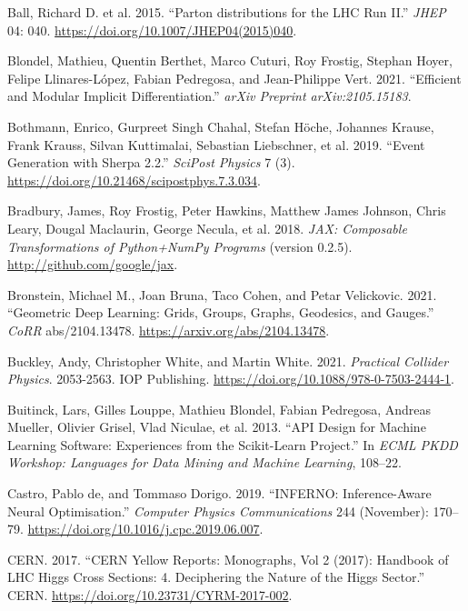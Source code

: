 \documentclass[
  11pt,
  numbers=noendperiod]{book}
\newlength{\cslhangindent}
\newlength{\cslentryspacingunit} %
\newenvironment{CSLReferences}[2] %
 {%
  \setlength{\parindent}{0pt}
  \ifodd #1
  \let\oldpar\par
  \def\par{\hangindent=\cslhangindent\oldpar}
  \fi
  \setlength{\parskip}{#2\cslentryspacingunit}
 }%
 {}
\begin{document}
\begin{CSLReferences}{1}{0}
\leavevmode{}%
Ball, Richard D. et al. 2015. {``{Parton distributions for the LHC Run
II}.''} \emph{JHEP} 04: 040.
\url{https://doi.org/10.1007/JHEP04(2015)040}.

\leavevmode{}%
Blondel, Mathieu, Quentin Berthet, Marco Cuturi, Roy Frostig, Stephan
Hoyer, Felipe Llinares-López, Fabian Pedregosa, and Jean-Philippe Vert.
2021. {``Efficient and Modular Implicit Differentiation.''} \emph{arXiv
Preprint arXiv:2105.15183}.

\leavevmode{}%
Bothmann, Enrico, Gurpreet Singh Chahal, Stefan Höche, Johannes Krause,
Frank Krauss, Silvan Kuttimalai, Sebastian Liebschner, et al. 2019.
{``Event Generation with Sherpa 2.2.''} \emph{{SciPost} Physics} 7 (3).
\url{https://doi.org/10.21468/scipostphys.7.3.034}.

\leavevmode{}%
Bradbury, James, Roy Frostig, Peter Hawkins, Matthew James Johnson,
Chris Leary, Dougal Maclaurin, George Necula, et al. 2018. \emph{{JAX}:
Composable Transformations of {P}ython+{N}um{P}y Programs} (version
0.2.5). \url{http://github.com/google/jax}.

\leavevmode{}%
Bronstein, Michael M., Joan Bruna, Taco Cohen, and Petar Velickovic.
2021. {``Geometric Deep Learning: Grids, Groups, Graphs, Geodesics, and
Gauges.''} \emph{CoRR} abs/2104.13478.
\url{https://arxiv.org/abs/2104.13478}.

\leavevmode{}%
Buckley, Andy, Christopher White, and Martin White. 2021.
\emph{Practical Collider Physics}. 2053-2563. IOP Publishing.
\url{https://doi.org/10.1088/978-0-7503-2444-1}.

\leavevmode{}%
Buitinck, Lars, Gilles Louppe, Mathieu Blondel, Fabian Pedregosa,
Andreas Mueller, Olivier Grisel, Vlad Niculae, et al. 2013. {``{API}
Design for Machine Learning Software: Experiences from the Scikit-Learn
Project.''} In \emph{ECML PKDD Workshop: Languages for Data Mining and
Machine Learning}, 108--22.

\leavevmode{}%
Castro, Pablo de, and Tommaso Dorigo. 2019. {``INFERNO: Inference-Aware
Neural Optimisation.''} \emph{Computer Physics Communications} 244
(November): 170--79. \url{https://doi.org/10.1016/j.cpc.2019.06.007}.

\leavevmode{}%
CERN. 2017. {``CERN Yellow Reports: Monographs, Vol 2 (2017): Handbook
of LHC Higgs Cross Sections: 4. Deciphering the Nature of the Higgs
Sector.''} CERN. \url{https://doi.org/10.23731/CYRM-2017-002}.


\end{CSLReferences}
\end{document}
